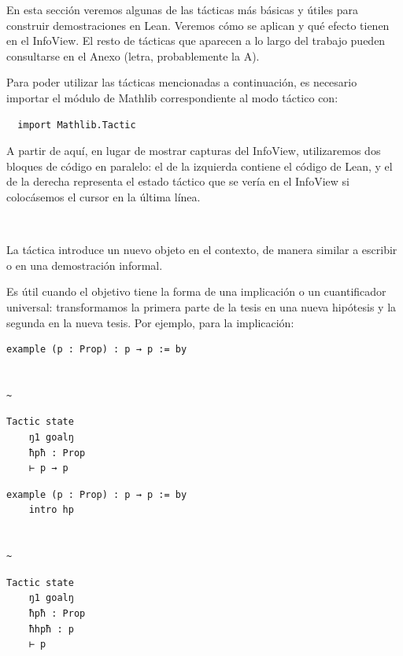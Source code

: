 En esta sección veremos algunas de las tácticas más básicas y útiles para construir demostraciones en Lean. Veremos cómo se aplican y qué efecto tienen en el InfoView. El resto de tácticas que aparecen a lo largo del trabajo pueden consultarse en el Anexo (letra, probablemente la A).

Para poder utilizar las tácticas mencionadas a continuación, es necesario importar el módulo de Mathlib correspondiente al modo táctico con:

\begin{lstlisting}
  import Mathlib.Tactic
\end{lstlisting}

A partir de aquí, en lugar de mostrar capturas del InfoView, utilizaremos dos bloques de código en paralelo: el de la izquierda contiene el código de Lean, y el de la derecha representa el estado táctico que se vería en el InfoView si colocásemos el cursor en la última línea.

\vspace{1em}
\noindent\textbf{$~$ }

La táctica  introduce un nuevo objeto en el contexto, de manera similar a escribir  o  en una demostración informal.

Es útil cuando el objetivo tiene la forma de una implicación o un cuantificador universal: transformamos la primera parte de la tesis en una nueva hipótesis y la segunda en la nueva tesis. Por ejemplo, para la implicación:


\begin{minipage}[t]{0.58\textwidth}
\begin{lstlisting}[language=lean]
  example (p : Prop) : p → p := by


~
\end{lstlisting}
\end{minipage}%
\hfill
\begin{minipage}[t]{0.40\textwidth}
\begin{lstlisting}[language=infoview]
  Tactic state
    ŋ1 goalŋ
    ħpħ : Prop
    ⊢ p → p
\end{lstlisting}
\end{minipage}
%
\noindent
\makebox[\textwidth]{$\downarrow$}
%
\begin{minipage}[t]{0.58\textwidth}
\begin{lstlisting}[language=lean]
  example (p : Prop) : p → p := by
    intro hp


~
\end{lstlisting}
\end{minipage}%
\hfill
\begin{minipage}[t]{0.40\textwidth}
\begin{lstlisting}[language=infoview]
  Tactic state
    ŋ1 goalŋ
    ħpħ : Prop
    ħhpħ : p
    ⊢ p
\end{lstlisting}
\end{minipage}


